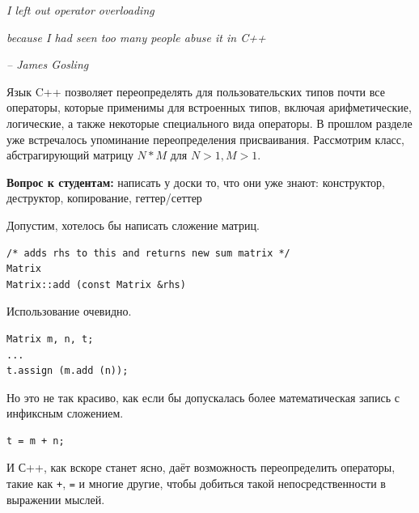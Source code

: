 \documentclass[a4paper,12pt,oneside]{article}
\newif\ifanswers
\begin{document}
\hfill\textit{I left out operator overloading}

\hfill\textit{because I had seen too many people abuse it in C++}{\vspace{0.5em}}

\hfill\textit{-- James Gosling}

Язык C++ позволяет переопределять для пользовательских типов почти все операторы, которые применимы для встроенных типов, включая арифметические, логические, а также некоторые специального вида операторы. В прошлом разделе уже встречалось упоминание переопределения присваивания. Рассмотрим класс, абстрагирующий матрицу $N*M$ для $N>1, M>1$.

\textbf{Вопрос к студентам:} написать у доски то, что они уже знают: конструктор, деструктор, копирование, геттер/сеттер

\ifanswers
Возможный ответ:

\begin{lstlisting}
class Matrix
{
public:
  Matrix (int n, int m) : m_n (n), m_m (m), m_buf (new int[n*m]()) {}
  ~Matrix () { delete [] m_buf; }

  Matrix (const Matrix &rhs) : m_n (rhs.m_n), m_m (rhs.m_m), m_buf (new int[m_n * m_m])
    {
      std::memcpy (m_buf, rhs.m_buf, rhs.m_n * rhs.m_m * sizeof (int));
    }

  void set (int x, int y, int val) { m_buf[x*m_m + y] = val; }
  int get (int x, int y) { return m_buf[x*m_m + y]; }

private:
  int m_n, m_m;
  int *m_buf;
};
\end{lstlisting}
\fi

Допустим, хотелось бы написать сложение матриц.

\begin{lstlisting}
/* adds rhs to this and returns new sum matrix */
Matrix
Matrix::add (const Matrix &rhs)
\end{lstlisting}

Использование очевидно.

\begin{lstlisting}
Matrix m, n, t;
...
t.assign (m.add (n));
\end{lstlisting}

Но это не так красиво, как если бы допускалась более математическая запись с инфиксным сложением.

\begin{lstlisting}
t = m + n;
\end{lstlisting}

И С++, как вскоре станет ясно, даёт возможность переопределить операторы, такие как \lstinline!+!, \lstinline!=! и многие другие, чтобы добиться такой непосредственности в выражении мыслей.
\end{document}

